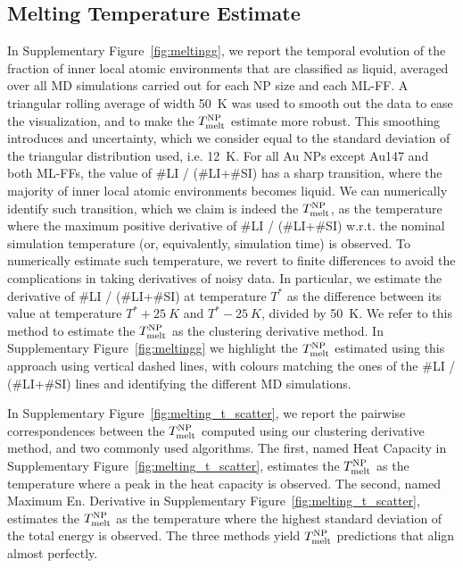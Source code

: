 \documentclass[%
aip,
 amsmath,amssymb,
 reprint,
]{revtex4-1}
\newcommand*\subt[1]{_{\textnormal{#1}}}
\newcommand*\supt[1]{^{\textnormal{#1}}}
\begin{document}
\subsection*{Melting Temperature Estimate}
%
In Supplementary Figure~\ref{fig:meltingg}, we report the temporal evolution of the fraction of inner local atomic environments that are classified as liquid, averaged over all MD simulations carried out for each NP size and each ML-FF.
%
A triangular rolling average of width 50~K was used to smooth out the data to ease the visualization, and to make the  $T\subt{melt}\supt{NP}$ estimate more robust.
%
This smoothing introduces and uncertainty, which we consider equal to the standard deviation of the triangular distribution used, i.e. 12~K.
%
For all Au NPs except Au147 and both ML-FFs, the value of \#LI / (\#LI+\#SI) has a sharp transition, where the majority of inner local atomic environments becomes liquid.
%
We can numerically identify such transition, which we claim is indeed the $T\subt{melt}\supt{NP}$, as the temperature where the maximum positive derivative of \#LI / (\#LI+\#SI)  w.r.t. the nominal simulation temperature (or, equivalently, simulation time) is observed.
%
To numerically estimate such temperature, we revert to finite differences to avoid the complications in taking derivatives of noisy data.
%
In particular, we estimate the derivative of \#LI / (\#LI+\#SI) at temperature $T^*$ as the difference between its value at temperature $T^* + 25~K$ and $T^* - 25~K$, divided by 50~K.
%
We refer to this method to estimate the $T\subt{melt}\supt{NP}$ as the clustering derivative method.
%
In Supplementary Figure~\ref{fig:meltingg} we highlight the $T\subt{melt}\supt{NP}$ estimated using this approach using vertical dashed lines, with colours matching the ones of the \#LI / (\#LI+\#SI) lines and identifying the different MD simulations.
%

In Supplementary Figure~\ref{fig:melting_t_scatter}, we report the pairwise correspondences between the $T\subt{melt}\supt{NP}$ computed using our clustering derivative method, and two commonly used algorithms.
%
The first, named Heat Capacity in Supplementary Figure~\ref{fig:melting_t_scatter}, estimates the $T\subt{melt}\supt{NP}$ as the temperature where a peak in the heat capacity is observed. \cite{Delgado-Callico2020, chen2020heating}
%
The second, named Maximum En. Derivative in Supplementary Figure~\ref{fig:melting_t_scatter}, estimates the $T\subt{melt}\supt{NP}$ as the temperature where the highest standard deviation of the total energy is observed. \cite{Delgado-Callico2020, chen2020heating}
%
The three methods yield $T\subt{melt}\supt{NP}$ predictions that align almost perfectly.
%
\end{document}
